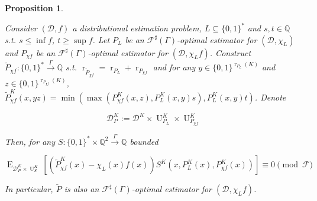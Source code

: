 \documentclass[11pt]{article}
\numberwithin{equation}{section}
\theoremstyle{definition}
\theoremstyle{plain}
\newtheorem{proposition}{Proposition}[section]
\newcommand{\Bool}{\{0,1\}}
\newcommand{\Words}{{\Bool^*}}
\DeclareMathOperator{\E}{E}
\DeclareMathOperator{\R}{r}
\DeclareMathOperator{\Un}{U}
\newcommand{\Rats}{\mathbb{Q}}
\newcommand{\Dist}{\mathcal{D}}
\newcommand{\Fall}{\mathcal{F}}
\newcommand{\ESG}{\Fall^\sharp(\Gamma)}
\newcommand{\BoolR}[1]{\Bool^{\R_{#1}(K)}}
\newcommand{\Scheme}{\xrightarrow{\Gamma}}
\begin{document}
\begin{samepage}
\begin{proposition}
\label{prp:thm__cond__lemma}

Consider $(\Dist, f)$ a distributional estimation problem, ${L \subseteq \Words}$ and $s, t \in \Rats$ s.t. ${s \leq \inf f}$, $t \geq \sup f$. Let $P_L$ be an $\ESG$-optimal estimator for $(\Dist, \chi_L)$ and $P_{\chi f}$ be an $\ESG$-optimal estimator for $(\Dist, \chi_L f)$. Construct $\tilde{P}_{\chi f}: \Words \Scheme \Rats$ s.t. $\R_{\tilde{P}_{\chi f}} = \R_{P_L} + \R_{P_{\chi f}}$ and for any ${y \in \BoolR{P_L}}$ and $z \in \BoolR{P_{\chi f}}$, ${\tilde{P}_{\chi f}^K(x,yz)=\min(\max(P_{\chi f}^K(x,z),P_L^K(x,y) s),P_L^K(x,y) t)}$. Denote 

\[\Dist_P^K:=\Dist^{K} \times \Un_{P_L}^K \times \Un_{P_{\chi f}}^K\] 

Then, for any $S: \Words \times \Rats^2 \Scheme \Rats$ bounded

\begin{equation}
\E_{\Dist_P^K \times \Un_S^K}[(\tilde{P}_{\chi f}^K(x)-\chi_L(x)f(x))S^K(x,P_L^K(x),P_{\chi f}^K(x))]  \equiv 0 \pmod \Fall
\end{equation}

In particular, $\tilde{P}$ is also an $\ESG$-optimal estimator for $(\Dist, \chi_L f)$.

\end{proposition}
\end{samepage}
\end{document}
